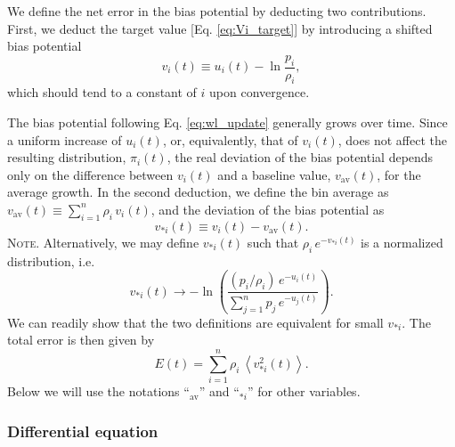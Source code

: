 \documentclass[preprint, superscriptaddress, floatfix]{revtex4-1}
\newcommand{\note}[1]{{\color{DarkGreen}\footnotesize \textsc{Note.} #1}}
\newcommand{\Err}{E}
\newcommand{\bav}[1]{#1_\mathrm{av}}
\begin{document}
We define the net error in the bias potential
by deducting two contributions.
%
First, we deduct the target value
[Eq. \eqref{eq:Vi_target}]
by introducing a shifted bias potential
%
\begin{equation}
  v_i(t)
  \equiv
  u_i(t)
  -
  \ln \frac { p_i }
            { \rho_i }
  ,
  \label{eq:v_def}
\end{equation}
%
which should tend to a constant of $i$
upon convergence.


The bias potential following Eq. \eqref{eq:wl_update}
generally grows over time.
%
Since a uniform increase of $u_i(t)$, or, equivalently, that of $v_i(t)$,
does not affect the resulting distribution, $\pi_i(t)$,
the real deviation of the bias potential
depends only on the difference between $v_i(t)$
and a baseline value, $\bav{v}(t)$,
for the average growth.\cite{
dama2014}
%
In the second deduction, we define
the bin average as $\bav{v}(t) \equiv \sum_{i=1}^n \rho_i \, v_i(t)$,
and the deviation of the bias potential as
%
\begin{equation}
  v_{*i}(t) \equiv v_i(t) - \bav{v}(t)
  .
\label{eq:x_def}
\end{equation}
%
\note{Alternatively,
  we may define $v_{*i}(t)$ such that
  $\rho_i \, e^{-v_{*i}(t)}$ is a normalized distribution,
  i.e.
  $$
  v_{*i}(t) \to -\ln\left(
    \frac{ (p_i/\rho_i) \, e^{ -u_i(t) } }
    { \sum_{j=1}^n p_j \, e^{ -u_j(t) } }
  \right).
  $$
  We can readily show that the two definitions are equivalent
  for small $v_{*i}$.}%
%
The total error is then given by
%
\begin{equation}
  \Err(t)
  =
  \sum_{i = 1}^n \rho_i \,
  \left\langle v_{*i}^2(t) \right\rangle
  .
\label{eq:error_def}
\end{equation}
%
Below we will use the notations ``$\bav{}$'' and ``$_{*i}$''
for other variables.




\subsubsection{\label{sec:sbin_diffeq}
Differential equation}
\end{document}
